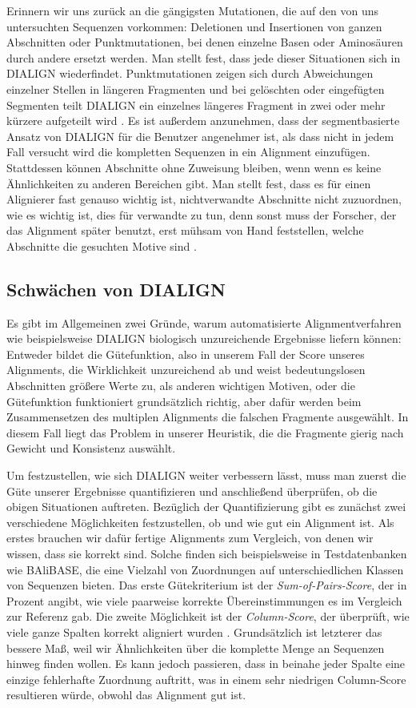 Erinnern wir uns zurück an die gängigsten Mutationen, die auf den von uns untersuchten Sequenzen vorkommen: Deletionen und Insertionen von ganzen Abschnitten oder Punktmutationen, bei denen einzelne Basen oder Aminosäuren durch andere ersetzt werden. Man stellt fest, dass jede dieser Situationen sich in DIALIGN wiederfindet. Punktmutationen zeigen sich durch Abweichungen einzelner Stellen in längeren Fragmenten und bei gelöschten oder eingefügten Segmenten teilt DIALIGN ein einzelnes längeres Fragment in zwei oder mehr kürzere aufgeteilt wird \cite{mfdw98}. Es ist außerdem anzunehmen, dass der segmentbasierte Ansatz von DIALIGN für die Benutzer angenehmer ist, als dass nicht in jedem Fall versucht wird die kompletten Sequenzen in ein Alignment einzufügen. Stattdessen können Abschnitte ohne Zuweisung bleiben, wenn wenn es keine Ähnlichkeiten zu anderen Bereichen gibt. Man stellt fest, dass es für einen Alignierer fast genauso wichtig ist, nichtverwandte Abschnitte nicht zuzuordnen, wie es wichtig ist, dies für verwandte zu tun, denn sonst muss der Forscher, der das Alignment später benutzt, erst mühsam von Hand feststellen, welche Abschnitte die gesuchten Motive sind \cite{m99}.

\subsection{Schwächen von DIALIGN}

Es gibt im Allgemeinen zwei Gründe, warum automatisierte Alignmentverfahren wie beispielsweise DIALIGN biologisch unzureichende Ergebnisse liefern können: Entweder bildet die Gütefunktion, also in unserem Fall der Score unseres Alignments, die Wirklichkeit unzureichend ab und weist bedeutungslosen Abschnitten größere Werte zu, als anderen wichtigen Motiven, oder die Gütefunktion funktioniert grundsätzlich richtig, aber dafür werden beim Zusammensetzen des multiplen Alignments die falschen Fragmente ausgewählt. In diesem Fall liegt das Problem in unserer Heuristik, die die Fragmente gierig nach Gewicht und Konsistenz auswählt. 

Um festzustellen, wie sich DIALIGN weiter verbessern lässt, muss man zuerst die Güte unserer Ergebnisse quantifizieren und anschließend überprüfen, ob die obigen Situationen auftreten. Bezüglich der Quantifizierung gibt es zunächst zwei verschiedene Möglichkeiten festzustellen, ob und wie gut ein Alignment ist. Als erstes brauchen wir dafür fertige Alignments zum Vergleich, von denen wir wissen, dass sie korrekt sind. Solche finden sich beispielsweise in Testdatenbanken wie BAliBASE, die eine Vielzahl von Zuordnungen auf unterschiedlichen Klassen von Sequenzen bieten. Das erste Gütekriterium ist der \emph{Sum-of-Pairs-Score}, der in Prozent angibt, wie viele paarweise korrekte Übereinstimmungen es im Vergleich zur Referenz gab. Die zweite Möglichkeit ist der \emph{Column-Score}, der überprüft, wie viele ganze Spalten korrekt aligniert wurden \cite{mpps06}. Grundsätzlich ist letzterer das bessere Maß, weil wir Ähnlichkeiten über die komplette Menge an Sequenzen hinweg finden wollen. Es kann jedoch passieren, dass in beinahe jeder Spalte eine einzige fehlerhafte Zuordnung auftritt, was in einem sehr niedrigen Column-Score resultieren würde, obwohl das Alignment gut ist.

